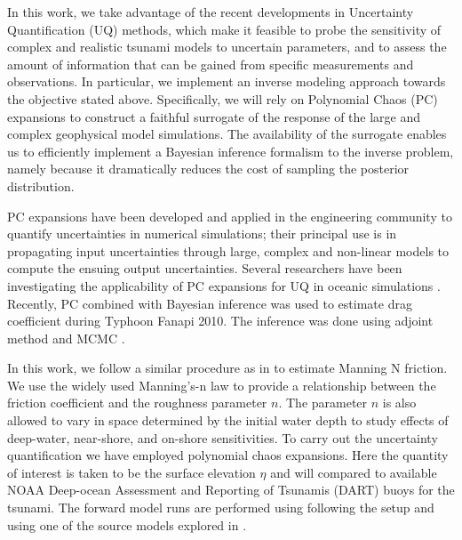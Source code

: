 In this work, we take advantage of the recent developments in Uncertainty Quantification 
(UQ) methods, which make it feasible to probe the sensitivity of complex and realistic tsunami models 
to uncertain parameters, and to assess the amount of information that can
be gained from specific measurements and observations. In particular, 
we implement an inverse modeling approach towards the objective stated above.  
Specifically, we will rely on Polynomial Chaos (PC) expansions to construct a 
faithful surrogate of the response of the large and complex geophysical 
model simulations.  The availability of the surrogate enables us to efficiently 
implement a Bayesian inference formalism to the inverse problem, namely 
because it dramatically reduces the cost of sampling the posterior distribution. 

PC expansions have been developed and applied in the engineering community to quantify uncertainties
in numerical simulations; their principal use is in propagating input
uncertainties through large, complex and non-linear models to compute the
ensuing output uncertainties. Several researchers have been 
investigating the applicability of PC expansions for UQ in oceanic simulations
\citep{thacker2012,ashwanth2010,Alexanderian2012}. Recently,
PC combined with Bayesian inference was used to estimate drag coefficient
during Typhoon Fanapi 2010. The inference was done using
adjoint method and MCMC \cite{sraj:2013a,sraj:2013b}.

In this work, we follow a similar procedure as in \cite{sraj:2013a,sraj:2013b}
to estimate Manning N friction. We use the widely used Manning's-n law to provide a relationship between the friction coefficient and the roughness parameter $n$.  The parameter $n$ is also allowed to vary in space determined by the initial water depth to study effects of deep-water, near-shore, and on-shore sensitivities.  To carry out the uncertainty quantification we have employed polynomial chaos expansions.  Here the quantity of interest is taken to be the surface elevation $\eta$ and will compared to available NOAA Deep-ocean Assessment and Reporting of Tsunamis (DART) buoys for the \tohoku tsunami.  The forward model runs are performed using \geoclaw following the setup and using one of the source models explored in \cite{MacInnes:2013cr}.

